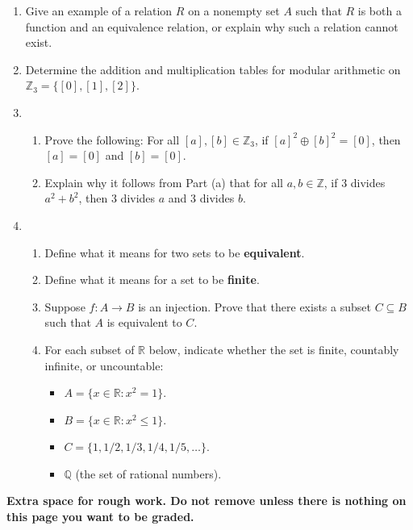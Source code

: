 \documentclass[12pt]{article}
\newcommand{\points}[1]{\marginpar{\hspace{24pt}[#1]}}
\newcommand{\R}{\mathbb{R}}
\newcommand{\Z}{\mathbb{Z}}
\begin{document}
\begin{enumerate}
 \item Give an example of a relation $R$ on a nonempty set $A$ such that $R$ is both a function and an equivalence relation, or explain why such a relation cannot exist. \points{1}


\newpage

\item Determine the addition and multiplication tables for modular arithmetic on $\Z_3 = \{[0],[1],[2]\}$. \points{4}

\vspace{4in}

\item \begin{enumerate}
       \item Prove the following: For all $[a],[b]\in \Z_3$, if $[a]^2\oplus [b]^2=[0]$, then $[a]=[0]$ and $[b]=[0]$. \points{4}

\vspace{2in}

 \item Explain why it follows from Part (a) that for all $a,b\in\Z$, if 3 divides $a^2+b^2$, then 3 divides $a$ and 3 divides $b$. \points{2}
      \end{enumerate}

\newpage

\item \begin{enumerate}
       \item Define what it means for two sets to be {\bf equivalent}. \points{1}

\vspace{1.25in}

\item Define what it means for a set to be {\bf finite}. \points{1}

\vspace{1.25in}

\item Suppose $f:A\to B$ is an injection. Prove that there exists a subset $C\subseteq B$ such that $A$ is equivalent to $C$. \points{4}

\vspace{3in}

\item For each subset of $\R$ below, indicate whether the set is finite, countably infinite, or uncountable: \points{4}
\begin{itemize}
 \item $A = \{x\in\R : x^2 = 1\}$.

\bigskip

 \item $B = \{x\in\R : x^2\leq 1\}$.

\bigskip

 \item $C = \{1, 1/2, 1/3, 1/4, 1/5, \ldots\}$.

\bigskip

 \item $\mathbb{Q}$ (the set of rational numbers).
\end{itemize}

      \end{enumerate}

\end{enumerate}
\newpage

{\bf Extra space for rough work. Do not remove unless there is nothing on this page you want to be graded.}
\end{document}
